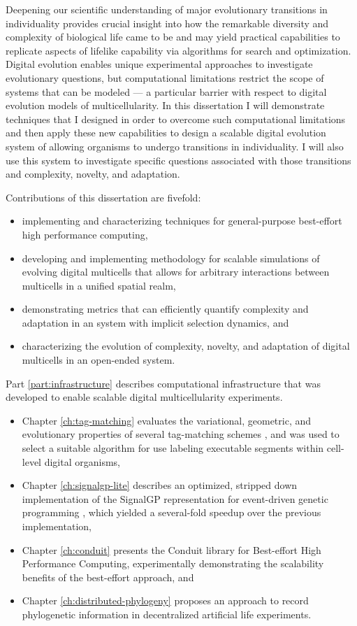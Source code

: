 Deepening our scientific understanding of major evolutionary transitions in individuality provides crucial insight into how the remarkable diversity and complexity of biological life came to be and may yield practical capabilities to replicate aspects of lifelike capability via algorithms for search and optimization.
Digital evolution enables unique experimental approaches to investigate evolutionary questions, but computational limitations restrict the scope of systems that can be modeled --- a particular barrier with respect to digital evolution models of multicellularity.
In this dissertation I will demonstrate techniques that I designed in order to overcome such computational limitations and then apply these new capabilities to design a scalable digital evolution system of allowing organisms to undergo transitions in individuality.
I will also use this system to investigate specific questions associated with those transitions and complexity, novelty, and adaptation.

Contributions of this dissertation are fivefold:
\begin{itemize}
\item implementing and characterizing techniques for general-purpose best-effort high performance computing,
\item developing and implementing methodology for scalable simulations of evolving digital multicells that allows for arbitrary interactions between multicells in a unified spatial realm,
\item demonstrating metrics that can efficiently quantify complexity and adaptation in an system with implicit selection dynamics, and
\item characterizing the evolution of complexity, novelty, and adaptation of digital multicells in an open-ended system.
\end{itemize}

Part \ref{part:infrastructure} describes computational infrastructure that was developed to enable scalable digital multicellularity experiments.
\begin{itemize}
\item Chapter \ref{ch:tag-matching} evaluates the variational, geometric, and evolutionary properties of several tag-matching schemes \citep{lalejini2018evolving}, and was used to select a suitable algorithm for use labeling executable segments within cell-level digital organisms,
\item Chapter \ref{ch:signalgp-lite} describes an optimized, stripped down implementation of the SignalGP representation for event-driven genetic programming \citep{lalejini2018evolving}, which yielded a several-fold speedup over the previous implementation,
\item Chapter \ref{ch:conduit} presents the Conduit library for Best-effort High Performance Computing, experimentally demonstrating the scalability benefits of the best-effort approach, and
\item Chapter \ref{ch:distributed-phylogeny} proposes an approach to record phylogenetic information in decentralized artificial life experiments.
\end{itemize}


